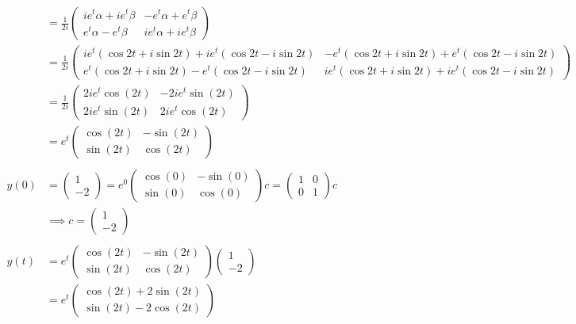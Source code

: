\documentclass{article}
\begin{document}
\begin{align*}
    &= \frac{1}{2i} \begin{pmatrix} ie^t \alpha + ie^t \beta & -e^t \alpha + e^t \beta \\ e^t \alpha - e^t \beta & ie^t \alpha + ie^t \beta \end{pmatrix} \\
    &= \frac{1}{2i} \begin{pmatrix} ie^t (\cos 2t + i \sin 2t) + ie^t (\cos 2t - i \sin 2t) & -e^t (\cos 2t + i \sin 2t) + e^t (\cos 2t - i \sin 2t) \\ e^t (\cos 2t + i \sin 2t) - e^t (\cos 2t - i \sin 2t) & ie^t (\cos 2t + i \sin 2t) + ie^t (\cos 2t - i \sin 2t) \end{pmatrix} \\
    &= \frac{1}{2i} \begin{pmatrix} 2i e^{t} \cos(2t) & -2i e^{t} \sin(2t) \\ 2i e^{t} \sin(2t) &  2i e^{t} \cos(2t) \end{pmatrix} \\
    &= e^t \begin{pmatrix} \cos(2t) & -\sin(2t) \\ \sin(2t) & \cos(2t) \end{pmatrix} \\
    \\
    y(0) &= \begin{pmatrix} 1 \\ -2 \end{pmatrix} = e^0 \begin{pmatrix} \cos(0) & -\sin(0) \\ \sin(0) & \cos(0) \end{pmatrix} c
    = \begin{pmatrix} 1 & 0 \\ 0 & 1 \end{pmatrix} c \\
    &\implies c = \begin{pmatrix} 1 \\ -2 \end{pmatrix} \\
    \\
    y(t) &= e^t \begin{pmatrix} \cos(2t) & -\sin(2t) \\ \sin(2t) & \cos(2t) \end{pmatrix} \begin{pmatrix} 1 \\ -2 \end{pmatrix} \\
    &= e^t \begin{pmatrix} \cos(2t) + 2\sin(2t) \\ \sin(2t) - 2\cos(2t) \end{pmatrix}
\end{align*}
\end{document}
